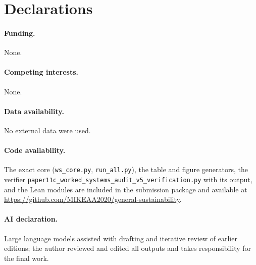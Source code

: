 \documentclass[11pt,a4paper]{article}
\theoremstyle{plain}
\theoremstyle{definition}
\theoremstyle{remark}
\begin{document}
\section*{Declarations}
\paragraph{Funding.} None.
\paragraph{Competing interests.} None.
\paragraph{Data availability.} No external data were used.
\paragraph{Code availability.} The exact core (\texttt{ws\_core.py}, \texttt{run\_all.py}), the table and figure generators, the verifier \texttt{paper11c\_worked\_systems\_audit\_v5\_verification.py} with its output, and the Lean modules are included in the submission package and available at \url{https://github.com/MIKEAA2020/general-sustainability}.
\paragraph{AI declaration.} Large language models assisted with drafting and iterative review of earlier editions; the author reviewed and edited all outputs and takes responsibility for the final work.
\end{document}
